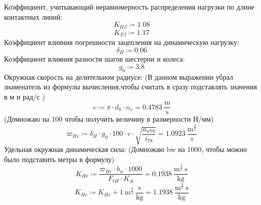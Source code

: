 \documentclass{article}
\newcommand{\defeq}{\coloneq} %
\begin{document}
\colorbox[HTML]{000000}{Коэффициент, учитывающий неравномерность распределения нагрузки по длине }\newline
\colorbox[HTML]{000000}{контактных линий:}\newline
\begin{equation*}
K_{Hβ} \defeq 1.08
\end{equation*}
\begin{equation*}
K_{Fβ} \defeq 1.17
\end{equation*}
\colorbox[HTML]{000000}{Коэффициент влияния погрешности зацепления на динамическую нагрузку:}\newline
\begin{equation*}
δ_{H} \defeq 0.06
\end{equation*}
\colorbox[HTML]{000000}{Коэффициент влияния разности шагов шестерни и колеса:}\newline
\begin{equation*}
\textit{g}_{\textit{0}} \defeq 3.8
\end{equation*}
\colorbox[HTML]{000000}{Окружная скорость на делительном радиусе:}\newline
\colorbox[HTML]{000000}{(В данном выражении убрал знаменатель из формулы вычисления,чтобы считать в сразу подставлять значения в м и рад/с )}\newline
\begin{equation*}
v \defeq {\pi} \cdot \textit{d}_{\textit{8}} \cdot n_{v} = {0.4783 \: \frac{\mathrm{m}}{\mathrm{s}}}
\end{equation*}
\colorbox[HTML]{000000}{(Домножаю на 100 чтобы получить величину в размерности Н/мм)}\newline
\begin{equation*}
ϖ_{Hv} \defeq δ_{H} \cdot \textit{g}_{\textit{0}} \cdot 100 \cdot v \cdot \sqrt{\frac{\textit{a}_{\textit{w78}}}{\textit{i}_{\textit{78}}}} = {1.0923 \: \frac{\mathrm{m}^{\frac{3}{2}}}{\mathrm{s}}}
\end{equation*}
\colorbox[HTML]{000000}{Удельная окружная динамическая сила:}\newline
\colorbox[HTML]{000000}{(Домножаю bw на 1000, чтобы можно было подставить метры  в формулу)}\newline
\begin{equation*}
K_{Hv} \defeq \frac{ϖ_{Hv} \cdot b_{w} \cdot 1000}{F_{tH} \cdot K_{A}} = {0.1938 \: \frac{\mathrm{m}^{\frac{3}{2}} \: \mathrm{s}}{\mathrm{kg}}}
\end{equation*}
\begin{equation*}
K_{Hv} \defeq K_{Hv}+1 \: \mathrm{m}^{\frac{3}{2}} \: \frac{\mathrm{s}}{\mathrm{kg}} = {1.1938 \: \frac{\mathrm{m}^{\frac{3}{2}} \: \mathrm{s}}{\mathrm{kg}}}
\end{equation*}
\end{document}
